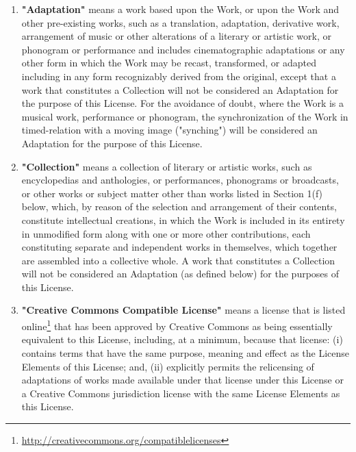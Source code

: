 \begin{enumerate}
          \item\textbf{"Adaptation"} means a work based upon
          the Work, or upon the Work and other pre-existing works,
          such as a translation, adaptation, derivative work,
          arrangement of music or other alterations of a literary
          or artistic work, or phonogram or performance and
          includes cinematographic adaptations or any other form in
          which the Work may be recast, transformed, or adapted
          including in any form recognizably derived from the
          original, except that a work that constitutes a
          Collection will not be considered an Adaptation for the
          purpose of this License. For the avoidance of doubt,
          where the Work is a musical work, performance or
          phonogram, the synchronization of the Work in
          timed-relation with a moving image ("synching") will be
          considered an Adaptation for the purpose of this
          License.

          \item\textbf{"Collection"} means a collection of
          literary or artistic works, such as encyclopedias and
          anthologies, or performances, phonograms or broadcasts,
          or other works or subject matter other than works listed
          in Section 1(f) below, which, by reason of the selection
          and arrangement of their contents, constitute
          intellectual creations, in which the Work is included in
          its entirety in unmodified form along with one or more
          other contributions, each constituting separate and
          independent works in themselves, which together are
          assembled into a collective whole. A work that
          constitutes a Collection will not be considered an
          Adaptation (as defined below) for the purposes of this
          License.

          \item\textbf{"Creative Commons Compatible
          License"} means a license that is listed online\footnote{
          \url{http://creativecommons.org/compatiblelicenses}} that has
          been approved by Creative Commons as being essentially
          equivalent to this License, including, at a minimum,
          because that license: (i) contains terms that have the
          same purpose, meaning and effect as the License Elements
          of this License; and, (ii) explicitly permits the
          relicensing of adaptations of works made available under
          that license under this License or a Creative Commons
          jurisdiction license with the same License Elements as
          this License.


\end{enumerate}
